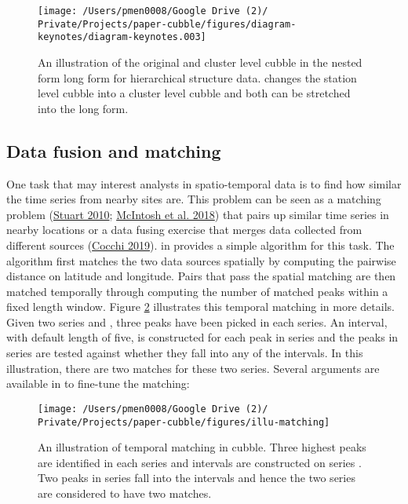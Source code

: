 \documentclass{article}
\begin{document}
\begin{figure}

{\centering \texttt{[image: /Users/pmen0008/Google Drive (2)/ Private/Projects/paper-cubble/figures/diagram-keynotes/diagram-keynotes.003]} 

}

\caption{An illustration of the original and cluster level cubble in the nested form long form for hierarchical structure data.  changes the station level cubble into a cluster level cubble and both can be stretched into the long form.}\label{fig:illu-hier}
\end{figure}

\hypertarget{matching}{%
\subsection{Data fusion and matching}\label{matching}}

One task that may interest analysts in spatio-temporal data is to find how similar the time series from nearby sites are. This problem can be seen as a matching problem (\protect\hyperlink{ref-stuart2010matching}{Stuart 2010}; \protect\hyperlink{ref-mcintosh2018using}{McIntosh et al. 2018}) that pairs up similar time series in nearby locations or a data fusing exercise that merges data collected from different sources (\protect\hyperlink{ref-cocchi2019data}{Cocchi 2019}).  in  provides a simple algorithm for this task. The algorithm first matches the two data sources spatially by computing the pairwise distance on latitude and longitude. Pairs that pass the spatial matching are then matched temporally through computing the number of matched peaks within a fixed length window. Figure \ref{fig:illu-matching} illustrates this temporal matching in more details. Given two series  and , three peaks have been picked in each series. An interval, with default length of five, is constructed for each peak in series  and the peaks in series  are tested against whether they fall into any of the intervals. In this illustration, there are two matches for these two series. Several arguments are available in  to fine-tune the matching:

\begin{figure}
\texttt{[image: /Users/pmen0008/Google Drive (2)/ Private/Projects/paper-cubble/figures/illu-matching]} \caption{An illustration of temporal matching in cubble. Three highest peaks are identified in each series and intervals are constructed on series . Two peaks in series  fall into the intervals and hence the two series are considered to have two matches.}\label{fig:illu-matching}
\end{figure}
\end{document}
